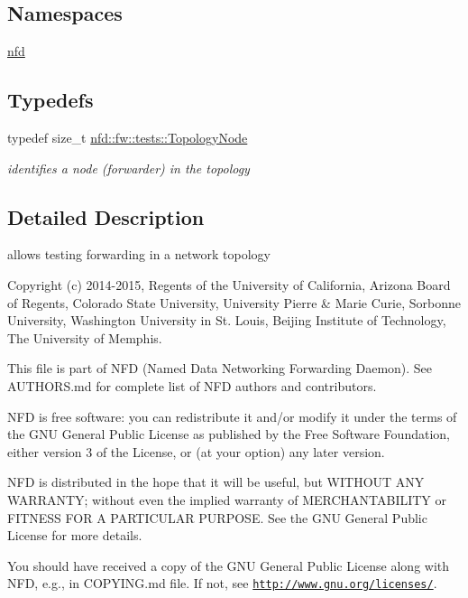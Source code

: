 \subsection*{Namespaces}
\begin{DoxyCompactItemize}
\item 
 \hyperlink{namespacenfd}{nfd}
\end{DoxyCompactItemize}
\subsection*{Typedefs}
\begin{DoxyCompactItemize}
\item 
typedef size\+\_\+t \hyperlink{topology-tester_8hpp_a65eed57bba998574cb3a2e62126f33e8}{nfd\+::fw\+::tests\+::\+Topology\+Node}\hypertarget{topology-tester_8hpp_a65eed57bba998574cb3a2e62126f33e8}{}\label{topology-tester_8hpp_a65eed57bba998574cb3a2e62126f33e8}

\begin{DoxyCompactList}\small\item\em identifies a node (forwarder) in the topology \end{DoxyCompactList}\end{DoxyCompactItemize}


\subsection{Detailed Description}
allows testing forwarding in a network topology 

Copyright (c) 2014-\/2015, Regents of the University of California, Arizona Board of Regents, Colorado State University, University Pierre \& Marie Curie, Sorbonne University, Washington University in St. Louis, Beijing Institute of Technology, The University of Memphis.

This file is part of N\+FD (Named Data Networking Forwarding Daemon). See A\+U\+T\+H\+O\+R\+S.\+md for complete list of N\+FD authors and contributors.

N\+FD is free software\+: you can redistribute it and/or modify it under the terms of the G\+NU General Public License as published by the Free Software Foundation, either version 3 of the License, or (at your option) any later version.

N\+FD is distributed in the hope that it will be useful, but W\+I\+T\+H\+O\+UT A\+NY W\+A\+R\+R\+A\+N\+TY; without even the implied warranty of M\+E\+R\+C\+H\+A\+N\+T\+A\+B\+I\+L\+I\+TY or F\+I\+T\+N\+E\+SS F\+OR A P\+A\+R\+T\+I\+C\+U\+L\+AR P\+U\+R\+P\+O\+SE. See the G\+NU General Public License for more details.

You should have received a copy of the G\+NU General Public License along with N\+FD, e.\+g., in C\+O\+P\+Y\+I\+N\+G.\+md file. If not, see \href{http://www.gnu.org/licenses/}{\tt http\+://www.\+gnu.\+org/licenses/}. 